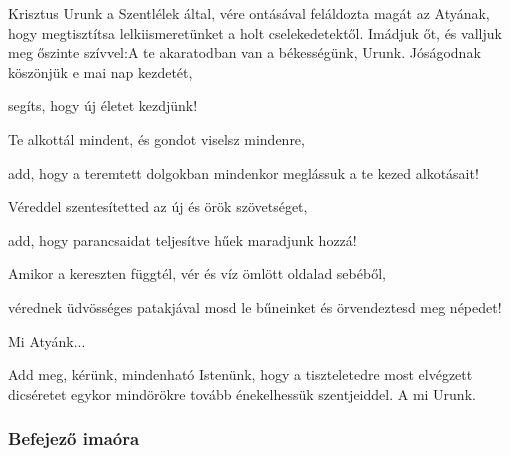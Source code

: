 \documentclass[twoside]{article}
\begin{document}
\begin{preces}{Krisztus Urunk a Szentlélek által, vére ontásával feláldozta magát az Atyának, hogy megtisztítsa lelkiismeretünket a holt cselekedetektől. Imádjuk őt, és valljuk meg őszinte szívvel:}{A te akaratodban van a békességünk, Urunk.}
  Jóságodnak köszönjük e mai nap kezdetét,

  \reddash segíts, hogy új életet kezdjünk!

  Te alkottál mindent, és gondot viselsz mindenre,

  \reddash add, hogy a teremtett dolgokban mindenkor meglássuk a te kezed alkotásait!

  Véreddel szentesítetted az új és örök szövetséget,

  \reddash add, hogy parancsaidat teljesítve hűek maradjunk hozzá!

  Amikor a kereszten függtél, vér és víz ömlött oldalad sebéből,

  \reddash vérednek üdvösséges patakjával mosd le bűneinket és örvendeztesd meg népedet!
\end{preces}
Mi Atyánk...


Add meg, kérünk, mindenható Istenünk, hogy a tiszteletedre most elvégzett dicséretet egykor mindörökre tovább énekelhessük szentjeiddel. A mi Urunk.

\label{f6/Compl}

\subsubsection*{Befejező imaóra}



\end{document}
